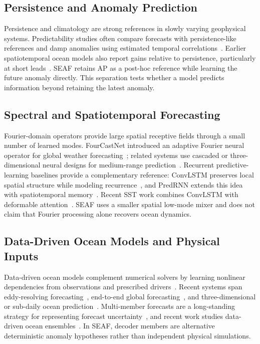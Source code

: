 \documentclass[conference]{IEEEtran}
\begin{document}
\subsection{Persistence and Anomaly Prediction}
Persistence and climatology are strong references in slowly varying geophysical systems. Predictability studies often compare forecasts with persistence-like references and damp anomalies using estimated temporal correlations~\cite{jacox2019dampedpersistence}. Earlier spatiotemporal ocean models also report gains relative to persistence, particularly at short leads~\cite{xiaoSpatiotemporalDeepLearning2019}. SEAF retains AP as a post-hoc reference while learning the future anomaly directly. This separation tests whether a model predicts information beyond retaining the latest anomaly.

\subsection{Spectral and Spatiotemporal Forecasting}
Fourier-domain operators provide large spatial receptive fields through a small number of learned modes. FourCastNet introduced an adaptive Fourier neural operator for global weather forecasting~\cite{pathak2022fourcastnet}; related systems use cascaded or three-dimensional neural designs for medium-range prediction~\cite{chen2023fuxi,bi2023accurate}. Recurrent predictive-learning baselines provide a complementary reference: ConvLSTM preserves local spatial structure while modeling recurrence~\cite{shiConvolutionalLSTMNetwork2015}, and PredRNN extends this idea with spatiotemporal memory~\cite{wangPredRNNRecurrentNeural2017}. Recent SST work combines ConvLSTM with deformable attention~\cite{shiSeaSurfaceTemperature2024}. SEAF uses a smaller spatial low-mode mixer and does not claim that Fourier processing alone recovers ocean dynamics.

\subsection{Data-Driven Ocean Models and Physical Inputs}
Data-driven ocean models complement numerical solvers by learning nonlinear dependencies from observations and prescribed drivers~\cite{boninoMachineLearningMethods2024,zhaoDeepLearningOcean2024}. Recent systems span eddy-resolving forecasting~\cite{cuiWenHaiForecastingEddying2025}, end-to-end global forecasting~\cite{elAouniGLONETMercatorEndtoEnd2024}, and three-dimensional or sub-daily ocean prediction~\cite{huangFuXiOceanGlobalOcean2025,wuAxiomOceanForecastingThreeDimensional2026}. Multi-member forecasts are a long-standing strategy for representing forecast uncertainty~\cite{molteni1996ecmwf}, and recent work studies data-driven ocean ensembles~\cite{huangFuXiONSDataDrivenEnsemble2026}. In SEAF, decoder members are alternative deterministic anomaly hypotheses rather than independent physical simulations.
\end{document}
